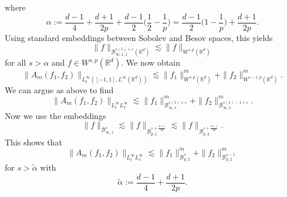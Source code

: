 \documentclass{amsart}
\theoremstyle{definition}
\newcommand {\Rd}{\mathbb{R}^{d}}
\numberwithin{equation}{section}
\begin{document}
{where
\[
\alpha := \frac{d-1}{4}+\frac{d+1}{2p} + \frac{d-1}{2} \Big( \frac{1}{2} - \frac{1}{p} \Big) = \frac{d-1}{2} \Big( 1 - \frac{1}{p} \Big) + \frac{d+1}{2p}.
\]
Using standard embeddings between Sobolev and Besov spaces, this yields
\[
\|f\|_{\mathcal{B}^{s(1)+\varepsilon}_{\infty,1,1}(\Rd)}\lesssim \| f \|_{W^{s,p}(\Rd)}
\]
for all $s>\alpha$ and $f\in W^{s,p}(\Rd)$.
We now obtain
\begin{equation*}
\| A_m(f_1,f_2) \|_{L_t^\infty([-1,1],L^\infty (\Rd))}\lesssim \| f_1 \|^m_{W^{s,p}(\Rd)} + \| f_2 \|^m_{W^{s-1,p}(\Rd)}.
\end{equation*}
We can argue as above to find
\begin{equation*}
\| A_m(f_1,f_2) \|_{L_t^\infty L_x^\infty} \lesssim \| f_1 \|^m_{\mathcal{B}^{s(1)+\varepsilon}_{\infty,1}} + \|f_2 \|^m_{\mathcal{B}^{s(1)-1+\varepsilon}_{\infty,1}}.
\end{equation*}
Now we use the embeddings
\begin{equation*}
\| f \|_{\mathcal{B}^{s}_{\infty,1}} \lesssim \| f \|_{\mathcal{B}^{s+\frac{d+1}{2p}}_{p,1}} \lesssim \| f \|_{\mathcal{B}^{s+\frac{d+1}{2p}}_{p,2}}.
\end{equation*}
This shows that 
\begin{equation*}
\| A_m(f_1,f_2) \|_{L_t^\infty L_x^\infty} \lesssim \| f_1 \|^m_{\mathcal{B}^{s}_{p,2}} + \| f_2 \|^m_{\mathcal{B}^{s-1}_{p,2}}
\end{equation*}
for $s> \tilde{\alpha}$ with
\begin{equation}
\label{eq:RegularityAdaptedSpaces}
\tilde{\alpha} := \frac{d-1}{4} + \frac{d+1}{2p}.
\end{equation}




}
\end{document}
